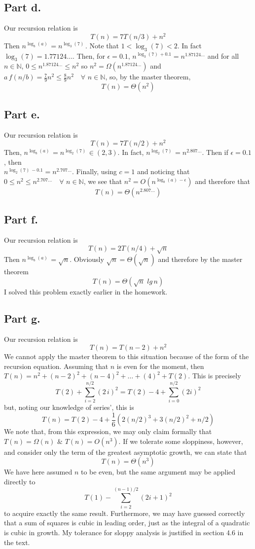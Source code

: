 \documentclass{article}
\newcommand{\nlg}[3]{n^{\log_{#2}(#1) \, #3}}
\begin{document}
    \subsection*{Part d.}
      Our recursion relation is $$T(n) = 7 T(n/3) + n^2 $$
      Then $\nlg{a}{b}{} = \nlg{7}{3}{}$.
      Note that $ 1 < \log_{3}(7) < 2$.
      In fact $\log_{3}(7) = 1.77124\dots$.
      Then, for $\epsilon = 0.1$, $\nlg{7}{3}{+0.1} = n^{1.87124\dots}$ and for all $n \in \mathbb{N}$, $ 0 \leq n^{1.87124\dots} \leq n^2 $ so
      $ n^2 = \Omega(n^{1.87124\dots})$ and $a \, f(n/b) = \frac{7}{9} n^2 \leq \frac{8}{9} n^2 \quad \forall \,\, n \in \mathbb{N}$, so, by the master theorem, $$T(n) = \Theta(n^2)$$

    \subsection*{Part e.}
      Our recursion relation is $$ T(n) = 7 T(n/2) + n^2 $$
      Then, $\nlg{a}{b}{} = \nlg{7}{2}{} \in (2,3)$.
      In fact, $ \nlg{7}{2}{} = n^{2.807\dots}$.
      Then if $\epsilon = 0.1$, then \\$\nlg{7}{2}{-0.1} = n^{2.707\dots}$.
      Finally, using $ c= 1$ and noticing that $ 0 \leq n^2 \leq n^{2.707\dots} \quad \forall \,\, n \in \mathbb{N}$, we see that $n^2 = O(\nlg{a}{b}{-\epsilon})$
      and therefore that $$T(n) = \Theta(n^{2.807\dots})$$

    \subsection*{Part f.}
      Our recursion relation is $$ T(n) = 2T(n/4) + \sqrt{n}$$
      Then $\nlg{a}{b}{} = \sqrt{n}$.
      Obviously $\sqrt{n} = \Theta(\sqrt{n})$ and therefore by the master theorem $$T(n) = \Theta(\sqrt{n} \,\,lg\, n)$$
      I solved this problem exactly earlier in the homework.

    \subsection*{Part g.}
      Our recursion relation is $$T(n) = T(n-2) + n^2$$
      We cannot apply the master theorem to this situation because of the form of the recursion equation.
      Assuming that $n$ is even for the moment, then $T(n) = n^2 + (n-2)^2 + (n-4)^2 + \dots +(4)^2+ T(2)$.
      This is precisely $$ T(2) + \sum_{i=2}^{n/2} (2\,i)^2 = T(2) - 4 + \sum_{i=0}^{n/2}(2i)^2  $$
      but, noting our knowledge of series', this is
      $$T(n) =  T(2) - 4 + \frac{1}{6}(2(n/2)^3  + 3(n/2)^2 + n/2)$$
      We note that, from this expression, we may only claim formally that
      $T(n) = \Omega(n) \,\, \& \,\, T(n) = O(n^3)$.
      If we tolerate some sloppiness, however, and consider only the term of the greatest asymptotic growth, we can state that $$T(n) = \Theta(n^3)$$
      We have here assumed $n$ to be even, but the same argument may be applied directly to
      $$ T(1) - \sum_{i=2}^{(n-1)/2}(2i+1)^2$$
      to acquire exactly the same result.
      Furthermore, we may have guessed correctly that a sum of squares is cubic in leading order, just as the integral of a quadratic is cubic in growth.
      My tolerance for sloppy analysis is justified in section 4.6 in the text.
\end{document}
